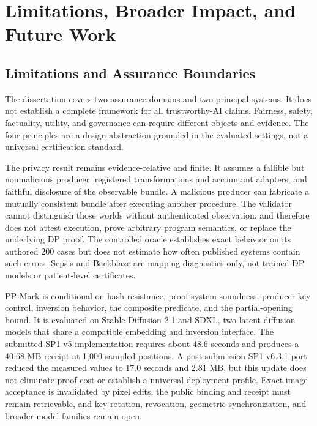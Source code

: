 \section{Limitations, Broader Impact, and Future Work}
\label{sec:ch5-limits-impact-future}

\subsection{Limitations and Assurance Boundaries}
\label{subsec:ch5-limitations}

The dissertation covers two assurance domains and two principal systems.  It does
not establish a complete framework for all trustworthy-AI claims.  Fairness,
safety, factuality, utility, and governance can require different objects and
evidence.  The four principles are a design abstraction grounded in the evaluated
settings, not a universal certification standard.

The privacy result remains evidence-relative and finite.  It assumes a fallible
but nonmalicious producer, registered transformations and accountant adapters, and
faithful disclosure of the observable bundle.  A malicious producer can fabricate
a mutually consistent bundle after executing another procedure.  The validator
cannot distinguish those worlds without authenticated observation, and therefore
does not attest execution, prove arbitrary program semantics, or replace the
underlying DP proof.  The controlled oracle establishes exact behavior on its
authored 200 cases but does not estimate how often published systems contain such
errors.  Sepsis and Backblaze are mapping diagnostics only, not trained DP models
or patient-level certificates.

PP-Mark is conditional on hash resistance, proof-system soundness, producer-key
control, inversion behavior, the composite predicate, and the partial-opening
bound.  It is evaluated on Stable Diffusion 2.1 and SDXL, two latent-diffusion
models that share a compatible embedding and inversion interface.  The submitted
SP1 v5 implementation requires about 48.6 seconds and produces a 40.68 MB receipt
at 1,000 sampled positions.  A post-submission SP1 v6.3.1 port reduced the measured
values to 17.0 seconds and 2.81 MB, but this update does not eliminate proof cost or
establish a universal deployment profile.  Exact-image acceptance is invalidated
by pixel edits, the public binding and receipt must remain retrievable, and key
rotation, revocation, geometric synchronization, and broader model families remain
open.

